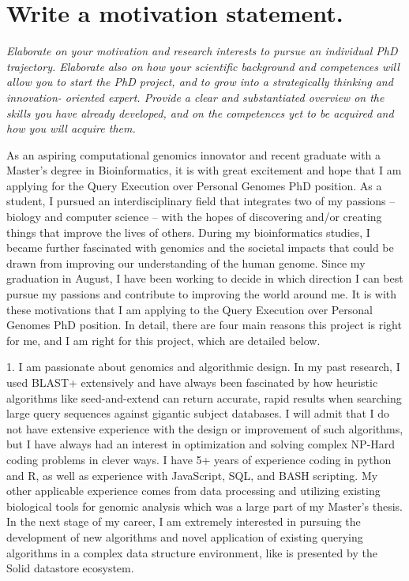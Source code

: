\section{Write a motivation statement.}
\textit{
Elaborate on your motivation and research interests to pursue an individual PhD trajectory. 
Elaborate also on how your scientific background and competences will allow you to start the PhD project, and to grow into a strategically thinking and innovation- oriented expert. 
Provide a clear and substantiated overview on the skills you have already developed, and on the competences yet to be acquired and how you will acquire them.
}

As an aspiring computational genomics innovator and recent graduate with a Master’s degree in Bioinformatics, it is with great excitement and hope that I am applying for the Query Execution over Personal Genomes PhD position. 
As a student, I pursued an interdisciplinary field that integrates two of my passions – biology and computer science – with the hopes of discovering and/or creating things that improve the lives of others. 
During my bioinformatics studies, I became further fascinated with genomics and the societal impacts that could be drawn from improving our understanding of the human genome. 
Since my graduation in August, I have been working to decide in which direction I can best pursue my passions and contribute to improving the world around me. 
It is with these motivations that I am applying to the Query Execution over Personal Genomes PhD position. 
In detail, there are four main reasons this project is right for me, and I am right for this project, which are detailed below.

1. I am passionate about genomics and algorithmic design. 
In my past research, I used BLAST+ extensively and have always been fascinated by how heuristic algorithms like seed-and-extend can return accurate, rapid results when searching large query sequences against gigantic subject databases. 
I will admit that I do not have extensive experience with the design or improvement of such algorithms, but I have always had an interest in optimization and solving complex NP-Hard coding problems in clever ways. 
I have 5+ years of experience coding in python and R, as well as experience with JavaScript, SQL, and BASH scripting. 
My other applicable experience comes from data processing and utilizing existing biological tools for genomic analysis which was a large part of my Master’s thesis. 
In the next stage of my career, I am extremely interested in pursuing the development of new algorithms and novel application of existing querying algorithms in a complex data structure environment, like is presented by the Solid datastore ecosystem.

